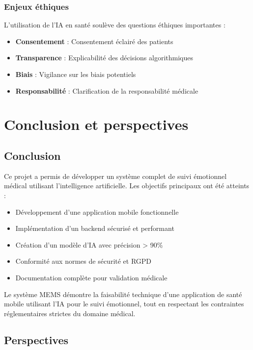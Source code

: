 \documentclass[a4paper,11pt]{report}
\begin{document}
\subsection{Enjeux éthiques}

L'utilisation de l'IA en santé soulève des questions éthiques importantes :

\begin{itemize}
    \item \textbf{Consentement} : Consentement éclairé des patients
    \item \textbf{Transparence} : Explicabilité des décisions algorithmiques
    \item \textbf{Biais} : Vigilance sur les biais potentiels
    \item \textbf{Responsabilité} : Clarification de la responsabilité médicale
\end{itemize}

\chapter{Conclusion et perspectives}

\section{Conclusion}

Ce projet a permis de développer un système complet de suivi émotionnel médical utilisant l'intelligence artificielle. Les objectifs principaux ont été atteints :

\begin{itemize}
    \item Développement d'une application mobile fonctionnelle
    \item Implémentation d'un backend sécurisé et performant
    \item Création d'un modèle d'IA avec précision > 90\%
    \item Conformité aux normes de sécurité et RGPD
    \item Documentation complète pour validation médicale
\end{itemize}

Le système MEMS démontre la faisabilité technique d'une application de santé mobile utilisant l'IA pour le suivi émotionnel, tout en respectant les contraintes réglementaires strictes du domaine médical.

\section{Perspectives}
\end{document}

